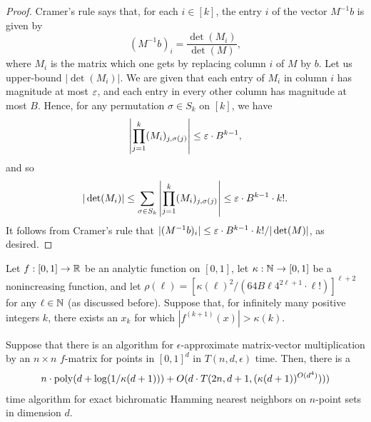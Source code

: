 \begin{proof}
Cramer's rule says that, for each $i \in [k]$, the entry $i$ of the vector $M^{-1}b$ is given by $$(M^{-1}b)_i = \frac{\det(M_i)}{\det(M)},$$ where $M_i$ is the matrix which one gets by replacing column $i$ of $M$ by $b$. Let us upper-bound $|\det(M_i)|$. We are given that each entry of $M_i$ in column $i$ has magnitude at most $\varepsilon$, and each entry in every other column has magnitude at most $B$. Hence, for any permutation $\sigma \in S_k$ on $[k]$, we have $$\left| \prod_{j=1}^k (M_i)_{j,\sigma(j)} \right| \leq \varepsilon \cdot B^{k-1},$$
and so $$|\det(M_i)| \leq  \sum_{\sigma \in S_k} \left| \prod_{j=1}^k (M_i)_{j,\sigma(j)} \right| \leq \varepsilon \cdot B^{k-1} \cdot k!.$$ It follows from Cramer's rule that $|(M^{-1}b)_i| \leq \varepsilon \cdot B^{k-1} \cdot k! / |\det(M)|$, as desired.
\end{proof}

\begin{lemma} \label{lem:step6}
Let $f : [0,1] \to {\mathbb R}$ be an analytic function on $[0,1]$, let $\kappa: {\mathbb N} \to [0,1]$ be a nonincreasing function, and let $\rho(\ell) = \left[\kappa(\ell)^2/(64B\ell 4^{2\ell+1}\cdot \ell!)\right]^{\ell+2}$ for any $\ell\in {\mathbb N}$ (as discussed before). Suppose that, for infinitely many positive integers $k$, there exists an $x_k$ for which $|f^{(k+1)}(x)| > \kappa(k)$.

Suppose that there is an algorithm for $\epsilon$-approximate matrix-vector multiplication by an $n\times n$ $f$-matrix for points in $[0,1]^d$ in $T(n,d,\epsilon)$ time. Then, there is a 
\begin{align*}
n \cdot \mathrm{poly}(d + \log(1/\kappa(d+1)))  + O(d \cdot T(2n,d+1,(\kappa(d+1))^{O(d^4)}))) \end{align*}
time algorithm for exact bichromatic Hamming nearest neighbors on $n$-point sets in dimension $d$.
\end{lemma}

